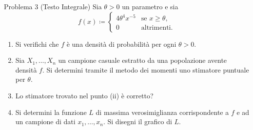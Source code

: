 \documentclass[11pt,a4paper]{article}
\begin{document}
\begin{problemabox}{Problema 3 (Testo Integrale)}
Sia $\theta>0$ un parametro e sia
\[
f(x) \coloneqq \begin{cases}
4\theta^4 x^{-5} & \text{se } x \ge \theta, \\
0 & \text{altrimenti.}
\end{cases}
\]
\begin{enumerate}[label=(\roman*)]
    \item Si verifichi che $f$ è una densità di probabilità per ogni $\theta>0$.
    \item Sia $X_1, \dots, X_n$ un campione casuale estratto da una popolazione avente densità $f$. Si determini tramite il metodo dei momenti uno stimatore puntuale per $\theta$.
    \item Lo stimatore trovato nel punto (ii) è corretto?
    \item Si determini la funzione $L$ di massima verosimiglianza corrispondente a $f$ e ad un campione di dati $x_1, \dots, x_n$. Si disegni il grafico di $L$.
\end{enumerate}
\end{problemabox}
\end{document}
